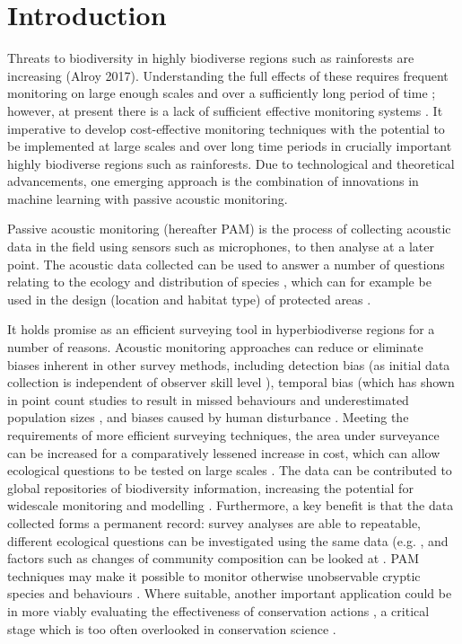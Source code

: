 \documentclass[11pt]{article}
\begin{document}
\doublespacing

\section{Introduction}

Threats to biodiversity in highly biodiverse regions such as rainforests are increasing (Alroy 2017). Understanding the full effects of these requires frequent monitoring on large enough scales \citep{underwood2005large,porter2009new} and over a sufficiently long period of time \citep{porter2005wireless}; however, at present there is a lack of sufficient effective monitoring systems \citep{proencca2017global}. It imperative to develop cost-effective monitoring techniques with the potential to be implemented at large scales and over long time periods in crucially important highly biodiverse regions such as rainforests. Due to technological and theoretical advancements, one emerging approach is the combination of innovations in machine learning with passive acoustic monitoring.

Passive acoustic monitoring (hereafter PAM) is the process of collecting acoustic data in the field using sensors such as microphones, to then analyse at a later point. The acoustic data collected can be used to answer a number of questions relating to the ecology and distribution of species \citep{browning2017passive}, which can for example be used in the design (location and habitat type) of protected areas \citep{rayment2009use}. 

It holds promise as an efficient surveying tool in hyperbiodiverse regions for a number of reasons. Acoustic monitoring approaches can reduce or eliminate biases inherent in other survey methods, including detection bias (as initial data collection is independent of observer skill level \citep{klingbeil2015bird}), temporal bias (which has shown in point count studies to result in missed behaviours and underestimated population sizes \citep{bridges2000temporal}, and biases caused by human disturbance \citep{alldredge2007time}. Meeting the requirements of more efficient surveying techniques, the area under surveyance can be increased for a comparatively lessened increase in cost, which can allow ecological questions to be tested on large scales \citep{wrege2017acoustic}. The data can be contributed to global repositories of biodiversity information, increasing the potential for widescale monitoring and modelling \citep{honrado2016fostering}. Furthermore, a key benefit is that the data collected forms a permanent record: survey analyses are able to repeatable, different ecological questions can be investigated using the same data (e.g. \citep{newson2017potential}, and factors such as changes of community composition can be looked at \citep{rogers2013density}. PAM techniques may make it possible to monitor otherwise unobservable cryptic species and behaviours \citep{wrege2017acoustic}. Where suitable, another important application could be in more viably evaluating the effectiveness of conservation actions \citep{wrege2017acoustic}, a critical stage which is too often overlooked in conservation science \citep{ferraro2006money,legg2006most}.
\end{document}
